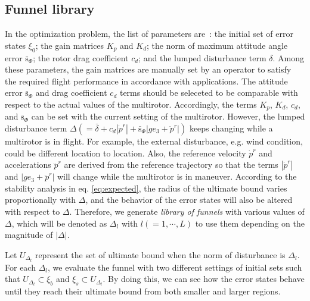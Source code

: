 \documentclass[letterpaper, 10 pt, conference]{ieeeconf}  %
\begin{document}
\subsection{Funnel library}
In the optimization problem, the list of parameters are~: the initial set of error states $\xi_0$; 
the gain matrices $K_p$ and $K_d$; 
the norm of maximum attitude angle error $\bar{\text{s}}_\Phi$;
the rotor drag coefficient $c_d$; and the lumped disturbance term $\delta$. 
Among these parameters, the gain matrices are manually set by an operator to satisfy the required flight performance in accordance with applications. 
The attitude error $\bar{\text{s}}_\Phi$ and drag coefficient $c_d$ terms should be seleceted to be comparable with respect to the actual values of the multirotor.
Accordingly, the terms $K_p$, $K_d$, $c_d$, and $\bar{\text{s}}_\Phi$ can be set with the current setting of the multirotor.
However, the lumped disturbance term $\Delta(=\bar{\delta}+c_d|\dot{p}^r|+\bar{\text{s}}_\Phi|ge_3 + \ddot{p}^r|)$ keeps changing while a multirotor is in flight. 
For example, the external disturbance, e.g. wind condition, could be different location to location.
Also, the reference velocity $\dot{p}^r$ and accelerations $\ddot{p}^r$ are derived from the reference trajectory so that the terms $|\dot{p}^r|$ and $|ge_3+\ddot{p}^r|$ will change while the multirotor is in maneuver.
According to the stability analysis in eq. \eqref{eq:expected}, 
the radius of the ultimate bound varies proportionally with $\Delta$, 
and the behavior of the error states will also be altered with respect to $\Delta$. 
Therefore, we generate \textit{library of funnels} with various values of $\Delta$, which will be denoted as $\Delta_l$ with $l(=1,\cdots,L)$ to use them depending on the magnitude of $|\Delta|$.

Let $U_{\Delta_l}$ represent the set of ultimate bound when the norm of disturbance is $\Delta_l$.
For each $\Delta_l$, we evaluate the funnel with two different settings of initial sets such that $U_{\Delta_l}\subset\xi_b$ and $\xi_s\subset U_{\Delta_l}$.
By doing this, we can see how the error states behave until they reach their ultimate bound from both smaller and larger regions.
\end{document}
